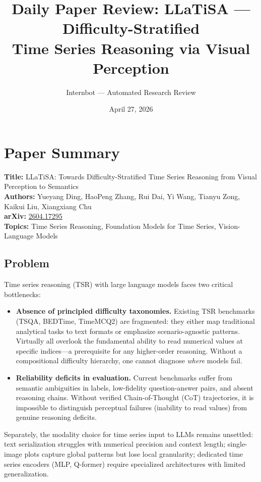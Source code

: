 \documentclass[11pt]{article}
\title{Daily Paper Review: LLaTiSA --- Difficulty-Stratified\\Time Series Reasoning via Visual Perception}
\author{Internbot --- Automated Research Review}
\date{April 27, 2026}
\begin{document}
\maketitle

\section{Paper Summary}

\textbf{Title:} LLaTiSA: Towards Difficulty-Stratified Time Series Reasoning from Visual Perception to Semantics \\
\textbf{Authors:} Yueyang Ding, HaoPeng Zhang, Rui Dai, Yi Wang, Tianyu Zong, Kaikui Liu, Xiangxiang Chu \\
\textbf{arXiv:} \href{https://arxiv.org/abs/2604.17295}{2604.17295} \\
\textbf{Topics:} Time Series Reasoning, Foundation Models for Time Series, Vision-Language Models

\subsection{Problem}

Time series reasoning (TSR) with large language models faces two critical bottlenecks:

\begin{itemize}
    \item \textbf{Absence of principled difficulty taxonomies.} Existing TSR benchmarks (TSQA, BEDTime, TimeMCQ2) are fragmented: they either map traditional analytical tasks to text formats or emphasize scenario-agnostic patterns. Virtually all overlook the fundamental ability to read numerical values at specific indices---a prerequisite for any higher-order reasoning. Without a compositional difficulty hierarchy, one cannot diagnose \emph{where} models fail.
    \item \textbf{Reliability deficits in evaluation.} Current benchmarks suffer from semantic ambiguities in labels, low-fidelity question-answer pairs, and absent reasoning chains. Without verified Chain-of-Thought (CoT) trajectories, it is impossible to distinguish perceptual failures (inability to read values) from genuine reasoning deficits.
\end{itemize}

Separately, the modality choice for time series input to LLMs remains unsettled: text serialization struggles with numerical precision and context length; single-image plots capture global patterns but lose local granularity; dedicated time series encoders (MLP, Q-former) require specialized architectures with limited generalization.
\end{document}
